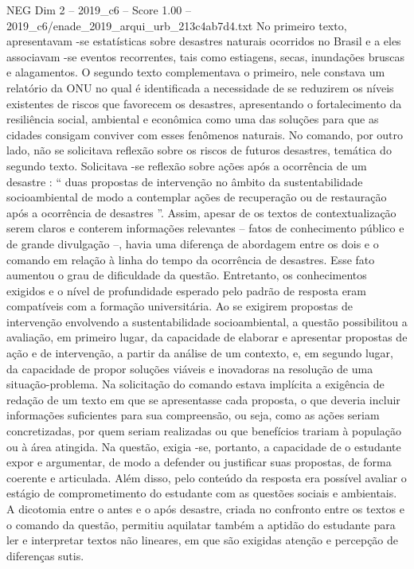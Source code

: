 \begin{textsample}{NEG Dim 2 – 2019\_c6 – Score 1.00 – 2019\_c6/enade\_2019\_arqui\_urb\_213c4ab7d4.txt}
No primeiro texto, apresentavam -se estatísticas sobre desastres naturais ocorridos no Brasil e a eles associavam -se eventos recorrentes, tais como estiagens, secas, inundações bruscas e alagamentos.
O segundo texto complementava o primeiro, nele constava um relatório da ONU no qual é identificada a necessidade de se reduzirem os níveis existentes de riscos que favorecem os desastres, apresentando o fortalecimento da resiliência social, ambiental e econômica como uma das soluções para que as cidades consigam conviver com esses fenômenos naturais.
No comando, por outro lado, não se solicitava reflexão sobre os riscos de futuros desastres, temática do segundo texto.
Solicitava -se reflexão sobre ações após a ocorrência de um desastre : “ duas propostas de intervenção no âmbito da sustentabilidade socioambiental de modo a contemplar ações de recuperação ou de restauração após a ocorrência de desastres ”.
Assim, apesar de os textos de contextualização serem claros e conterem informações relevantes – fatos de conhecimento público e de grande divulgação –, havia uma diferença de abordagem entre os dois e o comando em relação à linha do tempo da ocorrência de desastres.
Esse fato aumentou o grau de dificuldade da questão.
Entretanto, os conhecimentos exigidos e o nível de profundidade esperado pelo padrão de resposta eram compatíveis com a formação universitária.
Ao se exigirem propostas de intervenção envolvendo a sustentabilidade socioambiental, a questão possibilitou a avaliação, em primeiro lugar, da capacidade de elaborar e apresentar propostas de ação e de intervenção, a partir da análise de um contexto, e, em segundo lugar, da capacidade de propor soluções viáveis e inovadoras na resolução de uma situação-problema.
Na solicitação do comando estava implícita a exigência de redação de um texto em que se apresentasse cada proposta, o que deveria incluir informações suficientes para sua compreensão, ou seja, como as ações seriam concretizadas, por quem seriam realizadas ou que benefícios trariam à população ou à área atingida.
Na questão, exigia -se, portanto, a capacidade de o estudante expor e argumentar, de modo a defender ou justificar suas propostas, de forma coerente e articulada.
Além disso, pelo conteúdo da resposta era possível avaliar o estágio de comprometimento do estudante com as questões sociais e ambientais.
A dicotomia entre o antes e o após desastre, criada no confronto entre os textos e o comando da questão, permitiu aquilatar também a aptidão do estudante para ler e interpretar textos não lineares, em que são exigidas atenção e percepção de diferenças sutis.

\end{textsample}
